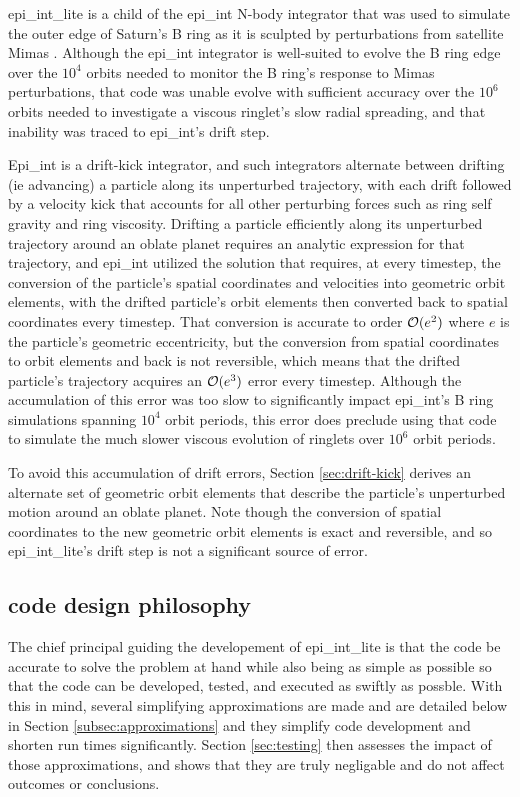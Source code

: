 \documentclass[preprint]{aastex62}
\begin{document}
epi\_int\_lite is a child of the epi\_int N-body integrator that was used to
simulate the outer edge of Saturn's B ring as it is sculpted by perturbations
from satellite Mimas \cite{HS13}. Although the epi\_int integrator is well-suited to evolve the
B ring edge over the $10^4$ orbits needed to monitor the B ring's response to Mimas
perturbations, that code was unable evolve with sufficient accuracy over the $10^6$ orbits needed
to investigate a viscous ringlet's slow radial spreading, and that inability was
traced to epi\_int's drift step. 

Epi\_int is a drift-kick integrator, and such integrators alternate between drifting
(ie advancing) a particle along its unperturbed trajectory, with each drift followed
by a velocity kick that accounts for all other perturbing forces such as ring self gravity
and ring viscosity. Drifting a particle efficiently along its unperturbed trajectory around
an oblate planet requires an analytic
expression for that trajectory, and epi\_int utilized the \cite{BL94} solution
that requires, at every timestep, the conversion of the particle's spatial coordinates
and velocities into geometric orbit elements, with the drifted particle's
orbit elements then converted back to spatial coordinates every timestep. That conversion is accurate
to order ${\cal O}(e^2)$ where $e$ is the particle's geometric eccentricity, but the
conversion from spatial coordinates to orbit elements and back is not reversible, which
means that the drifted particle's trajectory acquires an ${\cal O}(e^3)$ error
every timestep. Although the accumulation of this error was too slow to significantly impact
epi\_int's B ring simulations spanning $10^4$ orbit periods, this error does preclude 
using that code to simulate the much slower viscous evolution of ringlets over $10^6$ orbit periods.

To avoid this accumulation of drift errors, Section \ref{sec:drift-kick} derives an alternate set of geometric
orbit elements that describe the particle's unperturbed motion around an oblate planet. Note though
the conversion of spatial coordinates to the new geometric orbit elements is exact
and reversible, and so epi\_int\_lite's drift step is not a significant source of error. 

\subsection{code design philosophy}
\label{sec:philosophy}

The chief principal guiding the developement of epi\_int\_lite is that the code be
accurate to solve the problem at hand while also being as simple
as possible so that the code can be developed, tested, and executed as swiftly as possble.
With this in mind, several simplifying approximations are made and are detailed
below in Section \ref{subsec:approximations} and they simplify code development and
shorten run times significantly. Section \ref{sec:testing} then assesses the impact
of those approximations, and shows that they are truly negligable and do not affect outcomes
or conclusions.
\end{document}
